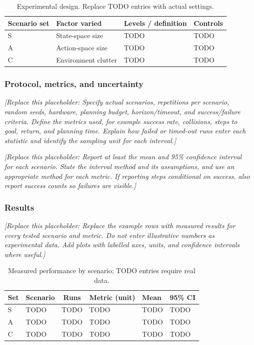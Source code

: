 \documentclass[11pt,a4paper]{article}
\newcommand{\placeholder}[1]{%
  \par\smallskip
  \noindent\textcolor{placeholderGray}{\textit{[Replace this placeholder: #1]}}
  \par\smallskip
}
\begin{document}
\begin{table}[htbp]
  \centering
  \caption{Experimental design. Replace TODO entries with actual settings.}
  \label{tab:experiment-design}
  \small
  \begin{tabularx}{\linewidth}{@{}lXXX@{}}
    \toprule
    Scenario set & Factor varied & Levels / definition & Controls \\
    \midrule
    S & State-space size & TODO & TODO \\
    A & Action-space size & TODO & TODO \\
    C & Environment clutter & TODO & TODO \\
    \bottomrule
  \end{tabularx}
\end{table}

\subsubsection*{Protocol, metrics, and uncertainty}
\placeholder{Specify actual scenarios, repetitions per scenario, random
seeds, hardware, planning budget, horizon/timeout, and success/failure
criteria. Define the metrics used, for example success rate, collisions,
steps to goal, return, and planning time. Explain how failed or timed-out
runs enter each statistic and identify the sampling unit for each interval.}

\placeholder{Report at least the mean and 95\% confidence interval for each
scenario. State the interval method and its assumptions, and use an
appropriate method for each metric. If reporting steps conditional on
success, also report success counts so failures are visible.}

\subsubsection*{Results}
\placeholder{Replace the example rows with measured results for every tested
scenario and metric. Do not enter illustrative numbers as experimental data.
Add plots with labelled axes, units, and confidence intervals where useful.}

\begin{table}[htbp]
  \centering
  \caption{Measured performance by scenario; TODO entries require real data.}
  \label{tab:results}
  \small
  \begin{tabularx}{\linewidth}{@{}llcXXX@{}}
    \toprule
    Set & Scenario & Runs & Metric (unit) & Mean & 95\% CI \\
    \midrule
    S & TODO & TODO & TODO & TODO & TODO \\
    A & TODO & TODO & TODO & TODO & TODO \\
    C & TODO & TODO & TODO & TODO & TODO \\
    \bottomrule
  \end{tabularx}
\end{table}
\end{document}
